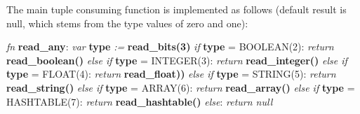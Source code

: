 The main tuple consuming function is implemented as follows
(default result is null, which stems from the type values of zero and one):

\begin{changemargin}{-60mm}{0mm}
\begin{myquote}

\vbox{
\textit{fn} \textbf{read\_any}: \newline
\indent\hspace{.5cm} \textit{var} \textbf{type} \textit{:=} \textbf{read\_bits(3)} \newline
\indent\hspace{.5cm} \textit{if} \textbf{type} = BOOLEAN(2): \newline
\indent\hspace{1cm} \textit{return} \textbf{read\_boolean()} \newline
\indent\hspace{.5cm} \textit{else if} \textbf{type} = INTEGER(3): \newline
\indent\hspace{1cm} \textit{return} \textbf{read\_integer()} \newline
\indent\hspace{.5cm} \textit{else if} \textbf{type} = FLOAT(4): \newline
\indent\hspace{1cm} \textit{return} \textbf{read\_float))} \newline
\indent\hspace{.5cm} \textit{else if} \textbf{type} = STRING(5): \newline
\indent\hspace{1cm} \textit{return} \textbf{read\_string()} \newline
\indent\hspace{.5cm} \textit{else if} \textbf{type} = ARRAY(6): \newline
\indent\hspace{1cm} \textit{return} \textbf{read\_array()} \newline
\indent\hspace{.5cm} \textit{else if} \textbf{type} = HASHTABLE(7): \newline
\indent\hspace{1cm} \textit{return} \textbf{read\_hashtable()} \newline
\indent\hspace{.5cm} \textit{else}: \newline
\indent\hspace{1cm} \textit{return null} \newline
}

\end{myquote}
\end{changemargin}

